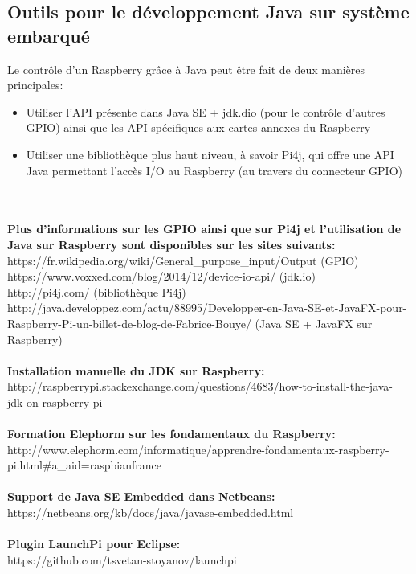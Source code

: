 \documentclass{article}
\begin{document}
\subsection{Outils pour le développement Java sur système embarqué}
Le contrôle d’un Raspberry grâce à Java peut être fait de deux manières principales:
\begin{itemize}
\item Utiliser l’API présente dans Java SE + jdk.dio (pour le contrôle d’autres GPIO) ainsi que les API spécifiques aux cartes annexes du Raspberry
\item Utiliser une bibliothèque plus haut niveau, à savoir Pi4j, qui offre une API Java permettant l’accès I/O au Raspberry (au travers du connecteur GPIO)
\end{itemize}
\\
\\
\textbf{Plus d’informations sur les GPIO ainsi que sur Pi4j et l’utilisation de Java sur Raspberry  sont disponibles sur les sites suivants:}\\
https://fr.wikipedia.org/wiki/General\_purpose\_input/Output (GPIO)\\
https://www.voxxed.com/blog/2014/12/device-io-api/ (jdk.io)\\
http://pi4j.com/ (bibliothèque Pi4j)\\
http://java.developpez.com/actu/88995/Developper-en-Java-SE-et-JavaFX-pour-Raspberry-Pi-un-billet-de-blog-de-Fabrice-Bouye/ (Java SE + JavaFX sur Raspberry)
\\
\\
\textbf{Installation manuelle du JDK sur Raspberry:}\\
http://raspberrypi.stackexchange.com/questions/4683/how-to-install-the-java-jdk-on-raspberry-pi
\\
\\
\textbf{Formation Elephorm sur les fondamentaux du Raspberry:}\\
http://www.elephorm.com/informatique/apprendre-fondamentaux-raspberry-pi.html\#a\_aid=raspbianfrance
\\
\\
\textbf{Support de Java SE Embedded dans Netbeans:}\\
https://netbeans.org/kb/docs/java/javase-embedded.html
\\
\\
\textbf{Plugin LaunchPi pour Eclipse:}\\
https://github.com/tsvetan-stoyanov/launchpi
\\
\\
\end{document}
